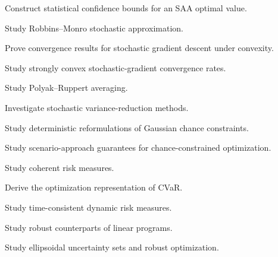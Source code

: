 \begin{exercise}[4]
Construct statistical confidence bounds for an SAA optimal value.
\end{exercise}

\begin{exercise}[4]
Study Robbins--Monro stochastic approximation.
\end{exercise}

\begin{exercise}[4]
Prove convergence results for stochastic gradient descent under convexity.
\end{exercise}

\begin{exercise}[4]
Study strongly convex stochastic-gradient convergence rates.
\end{exercise}

\begin{exercise}[4]
Study Polyak--Ruppert averaging.
\end{exercise}

\begin{exercise}[4]
Investigate stochastic variance-reduction methods.
\end{exercise}

\begin{exercise}[4]
Study deterministic reformulations of Gaussian chance constraints.
\end{exercise}

\begin{exercise}[4]
Study scenario-approach guarantees for chance-constrained optimization.
\end{exercise}

\begin{exercise}[4]
Study coherent risk measures.
\end{exercise}

\begin{exercise}[4]
Derive the optimization representation of CVaR.
\end{exercise}

\begin{exercise}[4]
Study time-consistent dynamic risk measures.
\end{exercise}

\begin{exercise}[4]
Study robust counterparts of linear programs.
\end{exercise}

\begin{exercise}[4]
Study ellipsoidal uncertainty sets and robust optimization.
\end{exercise}

